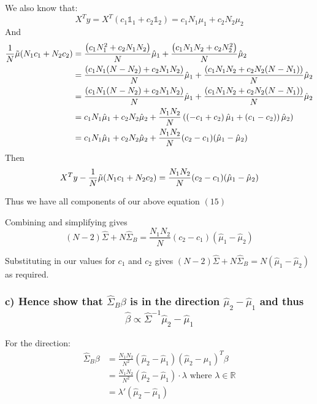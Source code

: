 We also know that:
$$X^T y = X^T(c_1 \mathbb{1}_1 + c_2 \mathbb{1}_2) = c_1 N_1 \mu_1 + c_2  N_2 \mu_2$$
And
\begin{align*}
     \frac{1}{N} \Tilde{\mu} (N_1 c_1 + N_2 c_2) &= 
\frac{\left(c_1 N_1^2 + c_2 N_1 N_2\right)}{N}\hat{\mu}_1 + \frac{\left(c_1 N_1 N_2 + c_2 N_2^2\right)}{N}\hat{\mu}_2 \\
&= \frac{\left(c_1 N_1 (N - N_2) +  c_2 N_1 N_2\right)}{N}\hat{\mu}_1 + \frac{\left(c_1 N_1 N_2 + c_2 N_2(N - N_1)\right)}{N}\hat{\mu}_2\\
&= \frac{\left(c_1 N_1 (N - N_2) +  c_2 N_1 N_2\right)}{N}\hat{\mu}_1 + \frac{\left(c_1 N_1 N_2 + c_2 N_2(N - N_1)\right)}{N}\hat{\mu}_2\\
&= c_1 N_1 \hat{\mu}_1 + c_2 N_2 \hat{\mu}_2 + \frac{N_1 N_2}{N} \left(\left(-c_1 +  c_2 \right)\hat{\mu}_1 + \left(c_1 - c_2 )\right)\hat{\mu}_2\right)\\
&= c_1 N_1 \hat{\mu}_1 + c_2 N_2 \hat{\mu}_2 + \frac{N_1 N_2}{N}(c_2 - c_1)(\hat{\mu}_1 - \hat{\mu}_2)
\end{align*}
Then 
$$X^T y - \frac{1}{N} \Tilde{\mu} (N_1 c_1 + N_2 c_2) = \frac{N_1 N_2}{N}(c_2 - c_1)(\hat{\mu}_1 - \hat{\mu}_2)$$

Thus we have all components of our above equation $(15)$

Combining and simplifying gives
$$(N-2) \hat{\Sigma} + N \hat{\Sigma}_B= \frac{N_1 N_2}{N}(c_2 - c_1)(\hat{\mu}_1 - \hat{\mu}_2) $$

Substituting in our values for $c_1$ and $c_2$ gives
$(N-2) \hat{\Sigma} + N \hat{\Sigma}_B= N(\hat{\mu}_1 - \hat{\mu}_2)  $ as required.



\subsubsection*{c) Hence show that $\hat{\Sigma}_B \beta$ is in the direction  $\hat{\mu}_2 - \hat{\mu}_1$ and thus
$$ \hat{\beta} \propto \hat{\Sigma}^{-1} \hat{\mu}_2 - \hat{\mu}_1 $$
}
For the direction:
\begin{align*}
    \hat{\Sigma}_B \beta &=  \frac{N_1 N_2}{N^2}  (\hat{\mu}_2 - \hat{\mu}_1) (\hat{\mu}_2 - \hat{\mu}_1)^T \beta \\
    &=  \frac{N_1 N_2}{N^2}  (\hat{\mu}_2 - \hat{\mu}_1) \cdot \lambda \text{ where } \lambda \in \mathbb{R} \\
    &=  \lambda' (\hat{\mu}_2 - \hat{\mu}_1) 
\end{align*}


